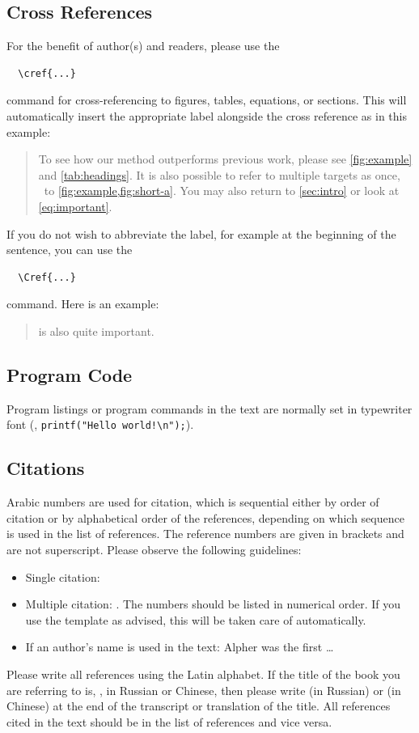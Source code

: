 \documentclass[runningheads]{llncs}
\begin{document}
\subsection{Cross References}
For the benefit of author(s) and readers, please use the
\begin{verbatim}
  \cref{...}
\end{verbatim}
command for cross-referencing to figures, tables, equations, or sections.
This will automatically insert the appropriate label alongside the cross reference as in this example:
\begin{quotation}
  To see how our method outperforms previous work, please see \cref{fig:example} and \cref{tab:headings}.
  It is also possible to refer to multiple targets as once, \eg~to \cref{fig:example,fig:short-a}.
  You may also return to \cref{sec:intro} or look at \cref{eq:important}.
\end{quotation}
If you do not wish to abbreviate the label, for example at the beginning of the sentence, you can use the
\begin{verbatim}
  \Cref{...}
\end{verbatim}
command. Here is an example:
\begin{quotation}
   is also quite important.
\end{quotation}


\subsection{Program Code}
Program listings or program commands in the text are normally set in typewriter font (\eg, \texttt{printf("Hello world!\textbackslash{}n");}).


\subsection{Citations}
Arabic numbers are used for citation, which is sequential either by order of citation or by alphabetical order of the references, depending on which sequence is used in the list of references. 
The reference numbers are given in brackets and are not superscript.
Please observe the following guidelines:
\begin{itemize}
\item Single citation: \cite{Anonymous24}
\item Multiple citation: \cite{Alpher02,Alpher03,Alpher05,Anonymous24b,Anonymous24}. 
  The numbers should be listed in numerical order.
  If you use the template as advised, this will be taken care of automatically.
\item If an author's name is used in the text: Alpher \cite{Alpher02} was the first \ldots
\end{itemize}
Please write all references using the Latin alphabet. If the title of the book you are referring to is, \eg, in Russian or Chinese, then please write (in Russian) or (in Chinese) at the end of the transcript or translation of the title.
All references cited in the text should be in the list of references and vice versa.
\end{document}
